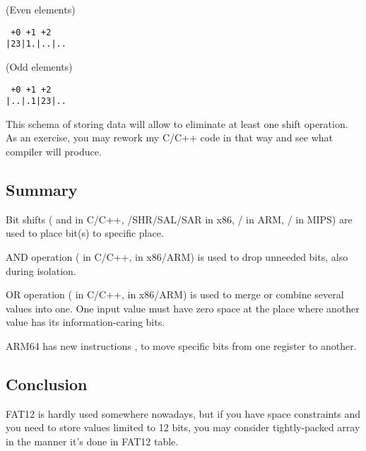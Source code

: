 (Even elements)

\begin{lstlisting}
 +0 +1 +2
|23|1.|..|..
\end{lstlisting}

(Odd elements)

\begin{lstlisting}
 +0 +1 +2
|..|.1|23|..
\end{lstlisting}

This schema of storing data will allow to eliminate at least one shift operation.
As an exercise, you may rework my C/C++ code in that way and see what compiler will produce.

\subsection{Summary}

Bit shifts (\TT{<<} and \TT{>>} in C/C++, /{SHR}/{SAL}/{SAR} in x86, / in ARM, / in MIPS) are used 
to place bit(s) to specific place.

AND operation (\TT{\&} in C/C++,  in x86/ARM) is used to drop unneeded bits, also during isolation.

OR operation (\TT{|} in C/C++,  in x86/ARM) is used to merge or combine several values into one.
One input value must have zero space at the place where another value has its information-caring bits.

ARM64 has new instructions ,  to move specific bits from one register to another.

\subsection{Conclusion}

FAT12 is hardly used somewhere nowadays, but if you have space constraints and you need to store values limited to 12 bits,
you may consider tightly-packed array in the manner it's done in FAT12 table.

